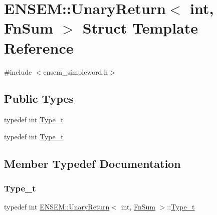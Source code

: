 \hypertarget{structENSEM_1_1UnaryReturn_3_01int_00_01FnSum_01_4}{}\section{E\+N\+S\+EM\+:\+:Unary\+Return$<$ int, Fn\+Sum $>$ Struct Template Reference}
\label{structENSEM_1_1UnaryReturn_3_01int_00_01FnSum_01_4}


{\ttfamily \#include $<$ensem\+\_\+simpleword.\+h$>$}

\subsection*{Public Types}
\begin{DoxyCompactItemize}
\item 
typedef int \mbox{\hyperlink{structENSEM_1_1UnaryReturn_3_01int_00_01FnSum_01_4_a0a0ed560534b6f9b4671d7bde05b28dc}{Type\+\_\+t}}
\item 
typedef int \mbox{\hyperlink{structENSEM_1_1UnaryReturn_3_01int_00_01FnSum_01_4_a0a0ed560534b6f9b4671d7bde05b28dc}{Type\+\_\+t}}
\end{DoxyCompactItemize}


\subsection{Member Typedef Documentation}
\mbox{\label{structENSEM_1_1UnaryReturn_3_01int_00_01FnSum_01_4_a0a0ed560534b6f9b4671d7bde05b28dc}} 
\subsubsection{\texorpdfstring{Type\_t}{Type\_t}\hspace{0.1cm}{\footnotesize\ttfamily [1/2]}}
{\footnotesize\ttfamily typedef int \mbox{\hyperlink{structENSEM_1_1UnaryReturn}{E\+N\+S\+E\+M\+::\+Unary\+Return}}$<$ int, \mbox{\hyperlink{structENSEM_1_1FnSum}{Fn\+Sum}} $>$\+::\mbox{\hyperlink{structENSEM_1_1UnaryReturn_3_01int_00_01FnSum_01_4_a0a0ed560534b6f9b4671d7bde05b28dc}{Type\+\_\+t}}}

\mbox{\label{structENSEM_1_1UnaryReturn_3_01int_00_01FnSum_01_4_a0a0ed560534b6f9b4671d7bde05b28dc}} 
